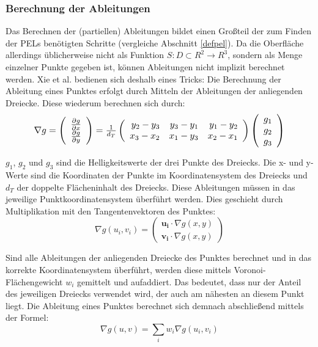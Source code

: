 \documentclass{paperStyle}
\begin{document}
\subsubsection{Berechnung der Ableitungen}
\label{pel-impl}
Das Berechnen der (partiellen) Ableitungen bildet einen Großteil der zum Finden der PELs benötigten Schritte (vergleiche Abschnitt \ref{defpel}). Da die Oberfläche allerdings üblicherweise nicht als Funktion $S : D \subset R^{2} \longrightarrow R^{3}$, sondern als Menge einzelner Punkte gegeben ist, können Ableitungen nicht implizit berechnet werden. Xie et al. bedienen sich deshalb eines Tricks:
Die Berechnung der Ableitung eines Punktes erfolgt durch Mitteln der Ableitungen der anliegenden Dreiecke. Diese wiederum berechnen sich durch:
\begin{equation}
\resizebox{.85\hsize}{!}{$\nabla g = \left(\begin{array}{c}\frac{\partial g}{\partial x} \\ \frac{\partial g}{\partial y}\end{array}\right) = \frac{1}{d_{T}} \left(\begin{array}{rrr}y_{2}-y_{3} & y_{3}-y_{1} & y_{1}-y_{2} \\ x_{3}-x_{2} & x_{1}-y_{3} & x_{2}-x_{1}\end{array}\right) \left(\begin{array}{c}g_{1} \\ g_{2} \\ g_{3}\end{array}\right)$}
\label{eq:derivativepel}
\end{equation}

$g_{1}$, $g_{2}$ und $g_{3}$ sind die Helligkeitswerte der drei Punkte des Dreiecks. Die x- und y-Werte sind die Koordinaten der Punkte im Koordinatensystem des Dreiecks und $d_{T}$ der doppelte Flächeninhalt des Dreiecks. Diese Ableitungen müssen in das jeweilige Punktkoordinatensystem überführt werden. Dies geschieht durch Multiplikation mit den Tangentenvektoren des Punktes:
\begin{equation}
\nabla g(u_{i},v_{i}) = \left(\begin{array}{c}\mathbf{u_{i}} \cdot \nabla g(x,y) \\ \mathbf{v_{i}} \cdot \nabla g(x,y)\end{array}\right)
\label{guivui}
\end{equation}

	
 Sind alle Ableitungen der anliegenden Dreiecke des Punktes berechnet und in das korrekte Koordinatensystem überführt, werden diese mittels Voronoi-Flächengewicht $w_{i}$ gemittelt und aufaddiert. Das bedeutet, dass nur der Anteil des jeweiligen Dreiecks verwendet wird, der auch am nähesten an diesem Punkt liegt. Die Ableitung eines Punktes berechnet sich demnach abschließend mittels der Formel:
 \begin{equation}
\nabla g(u,v) = \sum_{i} w_{i} \nabla g(u_{i},v_{i})
\label{guvl}
\end{equation}
 
\end{document}
